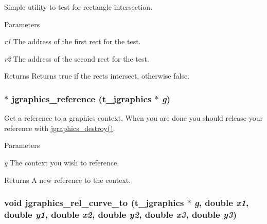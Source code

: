 Simple utility to test for rectangle intersection. 
\begin{DoxyParams}{Parameters}
\item[{\em r1}]The address of the first rect for the test. \item[{\em r2}]The address of the second rect for the test. \end{DoxyParams}
\begin{DoxyReturn}{Returns}
Returns true if the rects intersect, otherwise false. 
\end{DoxyReturn}
\hypertarget{group__jgraphics_ga3008118a280cac02b4c64ab6d0e6926e}{
\subsubsection[{jgraphics\_\-reference}]{$\ast$ jgraphics\_\-reference ({\bf t\_\-jgraphics} $\ast$ {\em g})}}
\label{group__jgraphics_ga3008118a280cac02b4c64ab6d0e6926e}


Get a reference to a graphics context. When you are done you should release your reference with \hyperlink{group__jgraphics_ga910977684c0f03be9edfb9f861905d5e}{jgraphics\_\-destroy()}.


\begin{DoxyParams}{Parameters}
\item[{\em g}]The context you wish to reference. \end{DoxyParams}
\begin{DoxyReturn}{Returns}
A new reference to the context. 
\end{DoxyReturn}
\hypertarget{group__jgraphics_gac3932cbd8b6a30144f0d827d7f21d16b}{
\subsubsection[{jgraphics\_\-rel\_\-curve\_\-to}]{\setlength{\rightskip}{0pt plus 5cm}void jgraphics\_\-rel\_\-curve\_\-to ({\bf t\_\-jgraphics} $\ast$ {\em g}, \/  double {\em x1}, \/  double {\em y1}, \/  double {\em x2}, \/  double {\em y2}, \/  double {\em x3}, \/  double {\em y3})}}
\label{group__jgraphics_gac3932cbd8b6a30144f0d827d7f21d16b}


